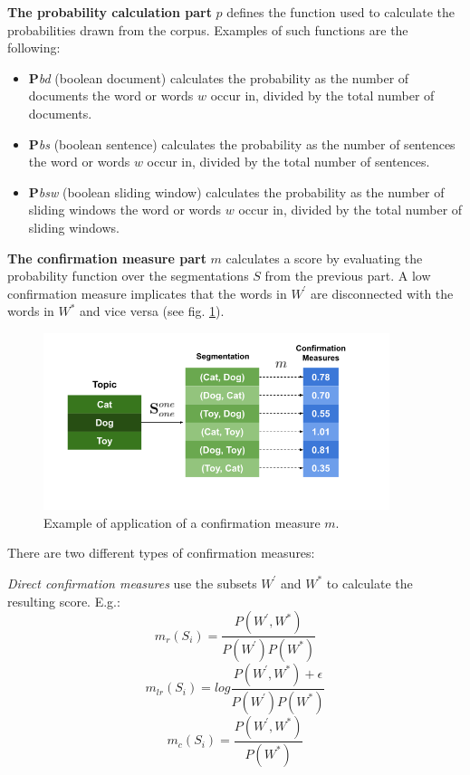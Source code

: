 \textbf{The probability calculation part} $p$ defines the function used to calculate the probabilities drawn from the corpus. Examples of such functions are the following:
\begin{itemize}
    \item \textbf{P}\textit{bd} (boolean document) calculates the probability as the number of documents the word or words $w$ occur in, divided by the total number of documents.
    \item \textbf{P}\textit{bs} (boolean sentence) calculates the probability as the number of sentences the word or words $w$ occur in, divided by the total number of sentences.
    \item \textbf{P}\textit{bsw} (boolean sliding window) calculates the probability as the number of sliding windows the word or words $w$ occur in, divided by the total number of sliding windows.
\end{itemize}
\textbf{The confirmation measure part} $m$ calculates a score by evaluating the probability function over the segmentations $S$ from the previous part. A low confirmation measure implicates that the words in $W^{'}$ are disconnected with the words in $W^{*}$ and vice versa (see fig. \ref{fig:tcp}). 
\begin{figure}[H]
    \centering
    \includegraphics[width=0.9\textwidth]{figures/coherenceproba}
    \caption{Example of application of a confirmation measure $m$. \cite{topiccoherencemeasures}}
    \label{fig:tcp}
\end{figure}
There are two different types of confirmation measures:

\textit{Direct confirmation measures} use the subsets $W^{'}$ and $W^{*}$ to calculate the resulting score. E.g.:
\begin{equation}
    m_r(S_i)=\frac{P(W^{'},W^{*})}{P(W^{'})P(W^{*})}
\end{equation}
\begin{equation}
    m_{lr}(S_i)=log\frac{P(W^{'},W^{*})+\epsilon}{P(W^{'})P(W^{*})}
\end{equation}
\begin{equation}
    m_c(S_i)=\frac{P(W^{'},W^{*})}{P(W^{*})}
\end{equation}

